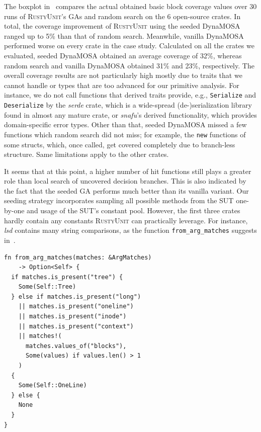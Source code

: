 \documentclass[paper=a4,%
  twoside,%
  BCOR4mm,%
  abstract=true,%
  toc=bibliography,%
  chapterprefix=true,%
  toc=bibliographynumbered,%
  open=right,%
  english,%
  pagesize=pdftex]{scrreprt}
\newcommand{\benchnum}{6\xspace}
\newcommand{\tech}{\textsc{RustyUnit}\xspace}
\newcommand{\runs}{30\xspace}
\newcommand{\sut}{\ac{SUT}\xspace}
\newcommand{\ga}{\ac{GA}\xspace}
\begin{document}
The boxplot in~ compares the actual obtained basic block coverage values over \runs runs of \tech's \acp{GA} and random search on the \benchnum open-source crates. In total, the coverage improvement of \tech using the seeded DynaMOSA ranged up to 5\% than that of random search. Meanwhile, vanilla DynaMOSA performed worse on every crate in the case study. Calculated on all the crates we evaluated, seeded DynaMOSA obtained an average coverage of 32\%, whereas random search and vanilla DynaMOSA obtained 31\% and 23\%, respectively. The overall coverage results are not particularly high mostly due to traits that we cannot handle or types that are too advanced for our primitive analysis. For instance, we do not call functions that derived traits provide, e.g., \texttt{Serialize} and \texttt{Deserialize} by the \emph{serde} crate, which is a wide-spread (de-)serialization library found in almost any mature crate, or \emph{snafu}'s derived functionality, which provides domain-specific error types. Other than that, seeded DynaMOSA missed a few functions which random search did not miss; for example, the \texttt{new} functions of some structs, which, once called, get covered completely due to branch-less structure. Same limitations apply to the other crates.

It seems that at this point, a higher number of hit functions still plays a greater role than local search of uncovered decision branches. This is also indicated by the fact that the seeded \ga performs much better than its vanilla variant. Our seeding strategy incorporates sampling all possible methods from the \sut one-by-one and usage of the \sut's constant pool. However, the first three crates hardly contain any constants \tech can practically leverage. For instance, \emph{lsd} contains many string comparisons, as the function \texttt{from\_arg\_matches} suggests in~.

\begin{lstlisting}[style=boxed, caption={An example test that invokes \texttt{FooBar::foo}}, label=lst:lsd-string-comparisons]
fn from_arg_matches(matches: &ArgMatches)
    -> Option<Self> {
  if matches.is_present("tree") {
    Some(Self::Tree)
  } else if matches.is_present("long")
    || matches.is_present("oneline")
    || matches.is_present("inode")
    || matches.is_present("context")
    || matches!(
      matches.values_of("blocks"),
      Some(values) if values.len() > 1
    )
  {
    Some(Self::OneLine)
  } else {
    None
  }
}
\end{lstlisting}
\end{document}
